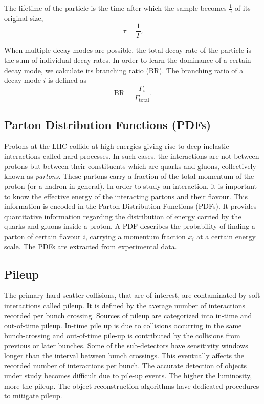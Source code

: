 The lifetime of the particle is the time after which the sample becomes $\frac{1}{e}$ of its original 
size,
\begin{equation}
    \tau = \frac{1}{\Gamma}.
\end{equation}

When multiple decay modes are possible, the total decay rate of the particle is the sum of individual 
decay rates. In order to learn the dominance of a certain decay mode, we calculate its branching 
ratio (BR). The branching ratio of a decay mode $i$ is defined as
\begin{equation}
    \text{BR} = \frac{\Gamma_i}{\Gamma_{\text{total}}}.
\end{equation}


\subsection*{Parton Distribution Functions (PDFs)}
Protons at the LHC collide at high energies giving rise to deep inelastic interactions called hard processes.
In such cases, the interactions are not between protons but between their constituents which are
quarks and gluons, collectively known as \textit{partons}. These partons carry a fraction of the total
momentum of the proton (or a hadron in general). In order to study an interaction, it is important to
know the effective energy of the interacting partons and their flavour. This information is encoded in 
the Parton Distribution Functions (PDFs). It provides quantitative information regarding the distribution
of energy carried by the quarks and gluons inside a proton. A PDF
describes the probability of finding a parton of certain flavour $i$, carrying a momentum 
fraction $x_i$ at a certain energy scale. The PDFs are extracted from experimental data. 

\subsection*{Pileup}
The 
primary hard scatter collisions, that are of interest, are contaminated by soft interactions 
called pileup. It is defined by the average number of interactions
recorded per bunch crossing. Sources of pileup are categorized into in-time and out-of-time pileup. In-time pile up is due to collisions
occurring in the same bunch-crossing and out-of-time pile-up is contributed by the collisions from previous
or later bunches. Some of the sub-detectors have sensitivity windows longer than the interval between
bunch crossings. This eventually affects the recorded number of interactions per bunch. The accurate
detection of objects under study becomes difficult due to pile-up events. The higher the 
luminosity, more the pileup. The object reconstruction algorithms have dedicated procedures 
to mitigate pileup.

